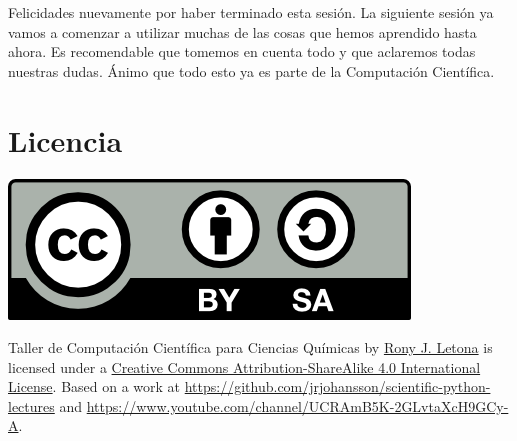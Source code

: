 \documentclass[10pt,letterpaper]{article}
\begin{document}
Felicidades nuevamente por haber terminado esta sesi\'on. La siguiente sesi\'on ya vamos a comenzar a utilizar muchas de las cosas que hemos aprendido hasta ahora. Es recomendable que tomemos en cuenta todo y que aclaremos todas nuestras dudas. \'Animo que todo esto ya es parte de la Computaci\'on Cient\'ifica.

\section*{Licencia}

\noindent \includegraphics{img/cc_big.png}

\noindent Taller de Computaci\'on Cient\'ifica para Ciencias Qu\'imicas by \href{http://github.com/zronyj/TC3Q}{Rony J. Letona} is licensed under a \href{http://creativecommons.org/licenses/by-sa/4.0/}{Creative Commons Attribution-ShareAlike 4.0 International License}.
Based on a work at \url{https://github.com/jrjohansson/scientific-python-lectures} and \url{https://www.youtube.com/channel/UCRAmB5K-2GLvtaXcH9GCy-A}.
\end{document}
